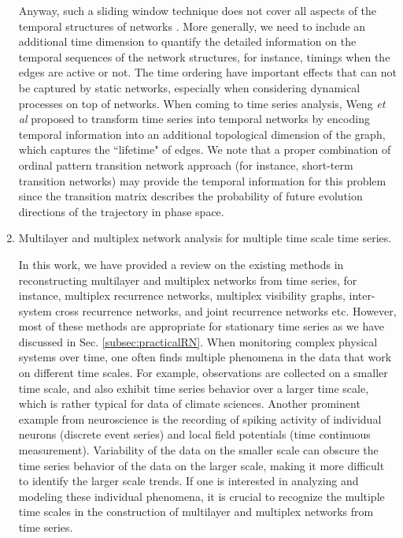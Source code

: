 \begin{enumerate}
	Anyway, such a sliding window technique does not cover all aspects of the temporal structures of networks \cite{Holme2012}. More generally, we need to include an additional time dimension to quantify the detailed information on the temporal sequences of the network structures, for instance, timings when the edges are active or not. The time ordering have important effects that can not be captured by static networks, especially when considering dynamical processes on top of networks. When coming to time series analysis, Weng {\textit{et al}} \cite{Weng2017} proposed to transform time series into temporal networks by encoding temporal information into an additional topological dimension of the graph, which captures the ``lifetime" of edges. We note that a proper combination of ordinal pattern transition network approach (for instance, short-term transition networks) may provide the temporal information for this problem since the transition matrix describes the probability of future evolution directions of the trajectory in phase space. 

		\item Multilayer and multiplex network analysis for multiple time scale time series. 

	In this work, we have provided a review on the existing methods in reconstructing multilayer and multiplex networks from time series, for instance, multiplex recurrence networks, multiplex visibility graphs, inter-system cross recurrence networks, and joint recurrence networks etc. However, most of these methods are appropriate for stationary time series as we have discussed in Sec. \ref{subsec:practicalRN}. When monitoring complex physical systems over time, one often finds multiple phenomena in the data that work on different time scales. For example, observations are collected on a smaller time scale, and also exhibit time series behavior over a larger time scale, which is rather typical for data of climate sciences. Another prominent example from neuroscience is the recording of spiking activity of individual neurons (discrete event series) and local field potentials (time continuous measurement). Variability of the data on the smaller scale can obscure the time series behavior of the data on the larger scale, making it more difficult to identify the larger scale trends. If one is interested in analyzing and modeling these individual phenomena, it is crucial to recognize the multiple time scales in the construction of multilayer and multiplex networks from time series.  



\end{enumerate}
